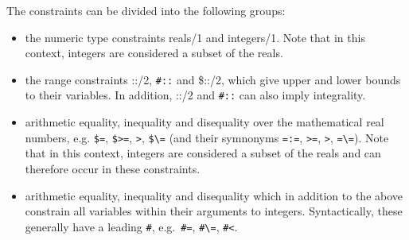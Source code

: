 The constraints can be divided into the following groups:
\begin{itemize}
\item the numeric type constraints reals/1 and integers/1.
    Note that in this context, integers are considered a subset of the reals.

\item the range constraints ::/2, \verb'#::' and \$::/2, which give upper
    and lower bounds to their variables. In addition, ::/2 and \verb'#::'
    can also imply integrality.

\item arithmetic equality, inequality and disequality over the mathematical
    real numbers, e.g.
    \verb'$=', \verb'$>=', \verb'>', \verb'$\=' (and their symnonyms
    \verb'=:=', \verb'>=', \verb'>', \verb'=\=').
    Note that in this context,
    integers are considered a subset of the reals and can therefore
    occur in these constraints.

\item arithmetic equality, inequality and disequality which in addition to
    the above constrain all variables within their arguments to integers.
    Syntactically, these generally have a leading \verb'#',
    e.g.\ \verb'#=', \verb'#\=', \verb'#<'.
\end{itemize}


